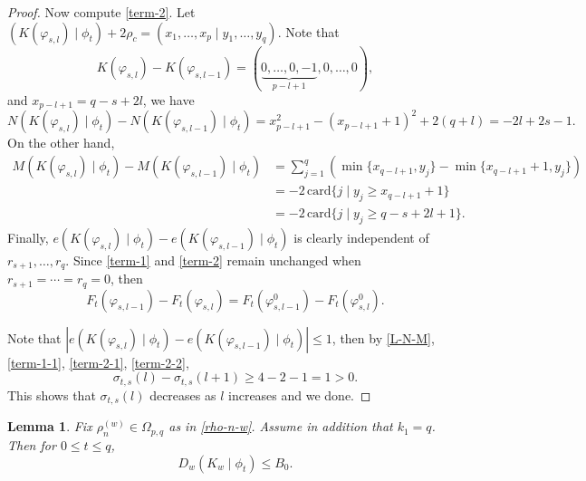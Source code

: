 \documentclass[11pt]{amsart}
\theoremstyle{plain}
\newtheorem{lemma}[thm]{Lemma}
\theoremstyle{definition}
\begin{document}
\begin{proof}
	Now compute \eqref{term-2}. Let $(K(\varphi_{s,l})\mid \phi_t)+2\rho_c=(x_1,\dots,x_p\mid y_1,\dots,y_q)$. Note that
	\[K(\varphi_{s,l})-K(\varphi_{s,l-1})=(\underbrace{0,\dots,0,-1}_{p-l+1},0,\dots,0),\]
	and $x_{p-l+1}=q-s+2l$, we have
	\begin{equation}\label{term-2-1}
		N(K(\varphi_{s,l})\mid \phi_t)-N(K(\varphi_{s,l-1})\mid \phi_t)=x_{p-l+1}^2-(x_{p-l+1}+1)^2+2(q+l)=-2l+2s-1.
	\end{equation}
On the other hand,
\begin{equation}\label{term-2-2}
	\begin{split}
	M(K(\varphi_{s,l})\mid \phi_t)-M(K(\varphi_{s,l-1})\mid\phi_t)&=\sum_{j=1}^q(\min\{x_{q-l+1},y_j\}-\min\{x_{q-l+1}+1,y_j\})\\
	&=-2\,\mathrm{card}\{j\mid y_j\ge x_{q-l+1}+1\}\\
	&=-2\, \mathrm{card}\{j\mid y_j\ge q-s+2l+1\}.
	\end{split}
\end{equation}
Finally, $e(K(\varphi_{s,l})\mid \phi_t)-e(K(\varphi_{s,l-1})\mid\phi_t)$ is clearly independent of $r_{s+1},\dots,r_q$. Since \eqref{term-1} and \eqref{term-2} remain unchanged when $r_{s+1}=\cdots=r_q=0$, then
\[F_t(\varphi_{s,l-1})-F_t(\varphi_{s,l})=F_t(\varphi_{s,l-1}^0)-F_t(\varphi_{s,l}^0).\]

Note that $|e(K(\varphi_{s,l})\mid \phi_t)-e(K(\varphi_{s,l-1})\mid \phi_t)|\le 1$, then by \eqref{L-N-M}, \eqref{term-1-1}, \eqref{term-2-1}, \eqref{term-2-2},
\[\sigma_{t,s}(l)-\sigma_{t,s}(l+1)\ge 4-2-1=1>0.\]
This shows that $\sigma_{t,s}(l)$ decreases as $l$ increases and we done.
\end{proof}
\begin{lemma}\label{lem-2}
	Fix $\rho_n^{(w)}\in\Omega_{p,q}$ as in \eqref{rho-n-w}. Assume in addition that $k_1=q$.
	Then for $0\le t\le q$,
	\begin{equation}\label{eq3}
		D_w(K_w\mid \phi_t)\le B_0.
	\end{equation}
\end{lemma}
\end{document}
